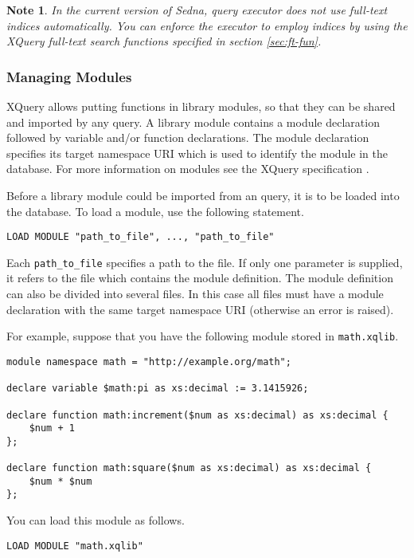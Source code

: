 \documentclass[a4paper,12pt]{article}
\newtheorem{note}{Note}
\begin{document}
\begin{note}In the current version of Sedna, query executor does not use full-text indices automatically. You can enforce the executor to employ indices by
using the XQuery full-text search functions specified in section \ref{sec:ft-fun}.
\end{note}

\subsubsection{Managing Modules}
XQuery allows putting functions in library modules, so that they can be shared and imported by any query.
A library module contains a module declaration followed by variable and/or function declarations. The module declaration specifies its target namespace URI which is used to identify the module in the database. For more information on modules see the XQuery specification \cite{paper:query-language}.

Before a library module could be imported from an query, it is to be loaded into the database. To load a module, use the following statement.

\begin{verbatim}
LOAD MODULE "path_to_file", ..., "path_to_file"
\end{verbatim}

Each \verb!path_to_file! specifies a path to the file. If only one parameter is supplied, it refers to the file which contains the module definition. The module definition can also be divided into several files. In this case all files must have a module declaration with the same target namespace URI (otherwise an error is raised).

For example, suppose that you have the following module stored in \verb!math.xqlib!.

\begin{verbatim}
module namespace math = "http://example.org/math";

declare variable $math:pi as xs:decimal := 3.1415926;

declare function math:increment($num as xs:decimal) as xs:decimal {
    $num + 1
};

declare function math:square($num as xs:decimal) as xs:decimal {
    $num * $num
};
\end{verbatim}

You can load this module as follows.

\begin{verbatim}
LOAD MODULE "math.xqlib"
\end{verbatim}
\end{document}
